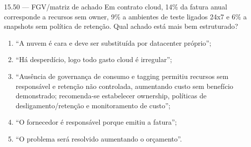 \begin{questao}{ 15.50 — FGV/matriz de achado}
Em contrato cloud, 14\% da fatura anual corresponde a recursos sem owner, 9\% a ambientes de teste ligados 24x7 e 6\% a snapshots sem política de retenção. Qual achado está mais bem estruturado?
\begin{enumerate}[label=\Alph*)]
\item ``A nuvem é cara e deve ser substituída por datacenter próprio'';
\item ``Há desperdício, logo todo gasto cloud é irregular'';
\item ``Ausência de governança de consumo e tagging permitiu recursos sem responsável e retenção não controlada, aumentando custo sem benefício demonstrado; recomenda-se estabelecer ownership, políticas de desligamento/retenção e monitoramento de custo'';
\item ``O fornecedor é responsável porque emitiu a fatura'';
\item ``O problema será resolvido aumentando o orçamento''.
\end{enumerate}
\end{questao}

